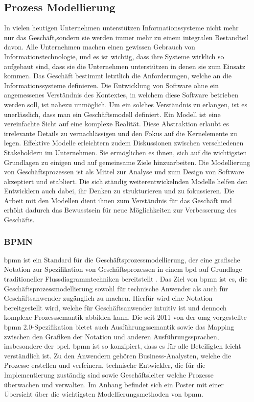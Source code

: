 \documentclass[a4paper, 12pt, twoside, headsepline=true]{scrartcl} %
\begin{document}
\subsection{Prozess Modellierung}

In vielen heutigen Unternehmen unterstützen Informationssysteme nicht mehr nur das Geschäft,sondern sie werden immer mehr zu einem integralen Bestandteil davon. Alle Unternehmen machen einen gewissen Gebrauch von Informationstechnologie, und es ist wichtig, dass ihre Systeme wirklich so aufgebaut sind, dass sie die Unternehmen unterstützen in denen sie zum Einsatz kommen. Das Geschäft bestimmt letztlich die Anforderungen, welche an die Informationssysteme definieren. Die Entwicklung von Software ohne ein angemessenes Verständnis des Kontextes, in welchem diese Software betrieben werden soll, ist nahezu unmöglich. Um ein solches Verständnis zu erlangen, ist es unerlässlich, dass man ein Geschäftsmodell definiert. Ein Modell ist eine vereinfachte Sicht auf eine
komplexe Realität. Diese Abstraktion erlaubt es irrelevante Details zu vernachlässigen und den Fokus auf die Kernelemente zu legen. Effektive Modelle erleichtern zudem
Diskussionen zwischen verschiedenen Stakeholdern im Unternehmen.
Sie ermöglichen es ihnen, sich auf die wichtigsten Grundlagen zu einigen und auf gemeinsame Ziele hinzuarbeiten. Die Modellierung von Geschäftsprozessen ist als Mittel zur Analyse und zum Design von Software akzeptiert und etabliert. Die sich ständig weiterentwickelnden Modelle helfen den Entwicklern auch dabei, ihr Denken zu strukturieren und zu fokussieren. Die Arbeit mit den Modellen dient ihnen zum Verständnis für das Geschäft und erhöht dadurch  das Bewusstsein für neue Möglichkeiten zur Verbesserung des Geschäfts.

\subsubsection{BPMN}

\ac{bpmn} ist ein Standard für die Geschäftsprozessmodellierung, der eine grafische Notation zur Spezifikation von Geschäftsprozessen in einem \ac{bpd} auf Grundlage traditioneller Flussdiagrammtechniken bereitstellt \cite[S.222]{Aagesen2015} 
. Das Ziel von \ac{bpmn} ist es, die Geschäftsprozessmodellierung sowohl für technische Anwender als auch für Geschäftsanwender  zugänglich zu machen. Hierfür wird eine Notation bereitgestellt wird, welche für Geschäftsanwender intuitiv ist und dennoch komplexe Prozesssemantik abbilden kann. Die seit 2011 von der \ac{omg} vorgestellte \ac{bpmn} 2.0-Spezifikation bietet auch Ausführungssemantik sowie das Mapping zwischen den Grafiken der Notation und anderen Ausführungssprachen, insbesondere der \ac{bpel}. \ac{bpmn} ist so konzipiert, dass es für alle Beteiligten leicht verständlich ist.
Zu den Anwendern gehören Business-Analysten, welche die Prozesse erstellen und verfeinern, technische Entwickler, die für die Implementierung zuständig sind sowie Geschäftsleiter welche Prozesse überwachen und verwalten. Im Anhang befindet sich ein Poster mit einer Übersicht über die wichtigsten Modellierungsmethoden von \ac{bpmn}. 
\end{document}
